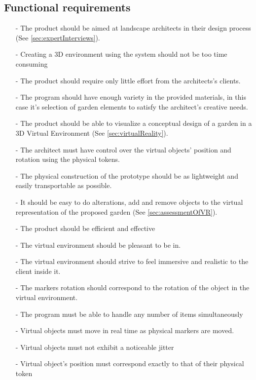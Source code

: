 				\subsection{Functional requirements}
					\begin{itemize}
						\item[-] The product should be aimed at landscape architects in their design process (See \autoref{sec:expertInterviews}).
						\item[-] Creating a 3D environment using the system should not be too time consuming
						\item[-] The product should require only little effort from the architects's clients.
						\item[-] The program should have enough variety in the provided materials, in this case it's selection of garden elements to satisfy the architect's creative needs.
						\item[-] The product should be able to visualize a conceptual design of a garden in a 3D Virtual Environment (See \autoref{sec:virtualReality}).
						\item[-] The architect must have control over the virtual objects' position and rotation using the physical tokens.
						
						\item[-] The physical construction of the prototype should be as lightweight and easily transportable as possible.
						
						\item[-] It should be easy to do alterations, add and remove objects to the virtual representation of the proposed garden (See \autoref{sec:assessmentOfVR}).
						\item[-] The product should be efficient and effective
						\item[-] The virtual environment should be pleasant to be in.
						\item[-] The virtual environment should strive to feel immersive and realistic to the client inside it.
						
						\item[-] The markers rotation should correspond to the rotation of the object in the virtual environment.
						\item[-] The program must be able to handle any number of items simultaneously
						\item[-] Virtual objects must move in real time as physical markers are moved.
						\item[-] Virtual objects must not exhibit a noticeable jitter
						\item[-] Virtual object's position must correspond exactly to that of their physical token
					\end{itemize}
					
